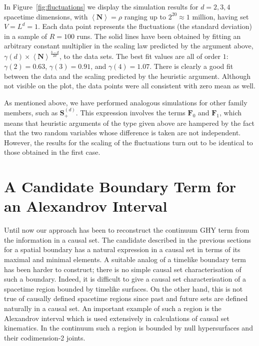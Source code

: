 \documentclass[12pt]{article}
\newcommand{\BF}[1]{\mathbf{F}_{#1}}
\begin{document}
In Figure~\ref{fig:fluctuations} we display the simulation results for $d=2,3,4$ spacetime dimensions, with $\left\langle\textbf{N}\right\rangle=\rho$ ranging up to $2^{20}\approx 1$ million, having set $V=L^d=1$. Each data point represents the fluctuations (the standard deviation) in a sample of $R=100$ runs. The solid lines have been obtained by fitting an arbitrary constant multiplier in the scaling law predicted by the argument above, $\gamma (d)\times \left\langle\textbf{N}\right\rangle^\frac{3-d}{2d}$, to the data sets. The best fit values are all of order $1$: $\gamma (2)=0.63$, $\gamma (3)=0.91$, and $\gamma (4)=1.07$.
There is clearly a good fit between the data and the scaling predicted by the heuristic argument. Although not visible on the plot, the data points were all consistent with zero mean as well.

As mentioned above, we have performed analogous simulations for other family members, such as $\mathbf S^{ (d)}_+$. This expression involves the terms $\BF{0}$ and $\BF{1}$, which means that heuristic arguments of the type given above are hampered by the fact that the two random variables whose difference is taken are not independent. However, the results for the scaling of the fluctuations turn out to be identical to those obtained in the first case.

\section{A Candidate Boundary Term for an Alexandrov Interval}
\newcommand{\vol}{\mathrm{vol}}

Until now our approach has been to reconstruct the  continuum GHY term  from the information in a causal set. 
The candidate described in the previous sections for a spatial boundary has a natural expression in a causal set  in  terms of its maximal and minimal elements. A suitable analog of a timelike boundary  term has been harder to  construct; there is no simple causal set  characterisation of such  a boundary. Indeed, it is difficult to give a causal set  characterisation of a spacetime region bounded by timelike surfaces. On the other hand, this is not true of causally defined spacetime regions since  past and future sets are defined naturally in  a causal set. An important example of such a region is the  Alexandrov interval which is used extensively  in calculations of causal set kinematics. In the continuum such a region is bounded by null hypersurfaces and their codimension-2 joints.  
\end{document}
